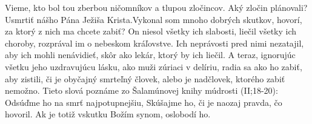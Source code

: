 Vieme, kto bol tou zberbou ničomníkov a tlupou zločincov. Aký zločin plánovali?
Usmrtiť nášho Pána Ježiša Krista.Vykonal som mnoho dobrých skutkov, hovorí, za ktorý z nich ma chcete zabiť? On niesol všetky ich slabosti, liečil všetky ich choroby, rozprával im o nebeskom kráľovstve.
Ich neprávosti pred nimi nezatajil, aby ich mohli nenávidieť, skôr ako    
lekár, ktorý by ich liečil. A teraz, ignorujúc všetku jeho uzdravujúcu lásku, ako muži zúriaci v delíriu, radia sa ako ho zabiť, aby zistili, či je obyčajný smrteľný človek, alebo je nadčlovek, ktorého zabiť nemožno. Tieto slová poznáme zo Šalamúnovej knihy múdrosti (II;18-20): 
Odsúďme ho na smrť najpotupnejšiu,
Skúšajme ho, či je naozaj pravda, čo hovoril.
Ak je totiž vskutku Božím synom, oslobodí ho.